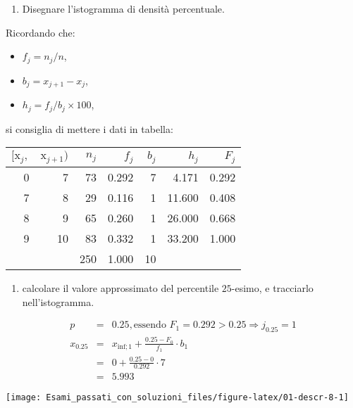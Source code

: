 \documentclass[
  11pt,
]{book}
\providecommand{\tightlist}{%
  \setlength{\itemsep}{0pt}\setlength{\parskip}{0pt}}
\theoremstyle{mytheoremstyle}
\theoremstyle{mydefstyle}
\newenvironment{sol}
  {
  \begin{tcolorbox}[enhanced,breakable,arc=0.1mm,boxrule=1pt,colback=white,colframe=iblue,
  title=\bf \fontfamily{lmss}\selectfont \hspace{.5 cm} Soluzione,drop fuzzy shadow]

}{
\end{tcolorbox}
  }
\begin{document}
\begin{enumerate}
\def\labelenumi{\alph{enumi}.}
\tightlist
\item
  Disegnare l'istogramma di densità percentuale.
\end{enumerate}

\begin{sol}

Ricordando che:

\begin{itemize}
\tightlist
\item
  \(f_j=n_j/n\),
\item
  \(b_j=x_{j+1}-x_{j}\),
\item
  \(h_j=f_j/b_j\times 100\),
\end{itemize}

si consiglia di mettere i dati in tabella:

\begin{table}[H]
\centering
\begin{tabular}{rrrrrrr}
\toprule
$[\text{x}_j,$ & $\text{x}_{j+1})$ & $n_j$ & $f_j$ & $b_j$ & $h_j$ & $F_j$\\
\midrule
0 & 7 & 73 & 0.292 & 7 & 4.171 & 0.292\\
7 & 8 & 29 & 0.116 & 1 & 11.600 & 0.408\\
8 & 9 & 65 & 0.260 & 1 & 26.000 & 0.668\\
9 & 10 & 83 & 0.332 & 1 & 33.200 & 1.000\\
 &  & 250 & 1.000 & 10 &  & \\
\bottomrule
\end{tabular}
\end{table}

\end{sol}

\begin{enumerate}
\def\labelenumi{\alph{enumi}.}
\setcounter{enumi}{1}
\tightlist
\item
  calcolare il valore approssimato del percentile \(25\)-esimo, e tracciarlo nell'istogramma.
\end{enumerate}

\begin{sol}

\begin{eqnarray*}
  p &=&  0.25 , \text{essendo }F_{ 1 }= 0.292  > 0.25  \Rightarrow j_{ 0.25 }= 1 \\
  x_{ 0.25 } &=& x_{\text{inf}; 1 } + \frac{ { 0.25 } - F_{ 0 }} {f_{ 1 }} \cdot b_{ 1 } \\
            &=&  0  + \frac {{ 0.25 } -  0 } { 0.292 } \cdot  7  \\
            &=&  5.993 
\end{eqnarray*}

\begin{center}\texttt{[image: Esami\_passati\_con\_soluzioni\_files/figure-latex/01-descr-8-1]} \end{center}

\end{sol}
\end{document}
